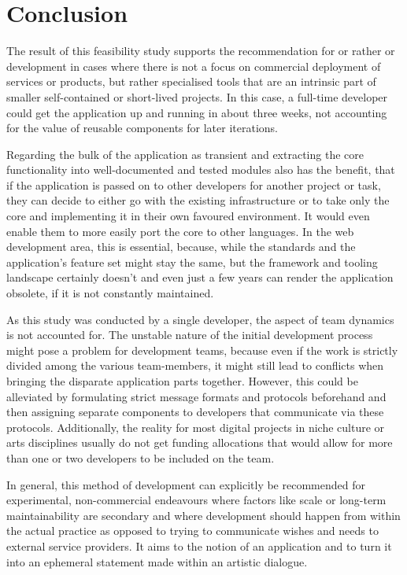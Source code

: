 \chapter{Conclusion}

The result of this feasibility study supports the recommendation for  or rather  or  development in cases where there is not a focus on commercial deployment of services or products, but rather specialised tools that are an intrinsic part of smaller self-contained or short-lived projects. In this case, a full-time developer could get the application up and running in about three weeks, not accounting for the value of reusable components for later iterations.

Regarding the bulk of the application as transient and extracting the core functionality into well-documented and tested modules also has the benefit, that if the application is passed on to other developers for another project or task, they can decide to either go with the existing infrastructure or to take only the core and implementing it in their own favoured environment. It would even enable them to more easily port the core to other languages. In the web development area, this is essential, because, while the standards and the application's feature set might stay the same, but the framework and tooling landscape certainly doesn't and even just a few years can render the application obsolete, if it is not constantly maintained.

As this study was conducted by a single developer, the aspect of team dynamics is not accounted for. The unstable nature of the initial development process might pose a problem for development teams, because even if the work is strictly divided among the various team-members, it might still lead to conflicts when bringing the disparate application parts together. However, this could be alleviated by formulating strict message formats and protocols beforehand and then assigning separate components to developers that communicate via these protocols. Additionally, the reality for most digital projects in niche culture or arts disciplines usually do not get funding allocations that would allow for more than one or two developers to be included on the team.

In general, this method of development can explicitly be recommended for experimental, non-commercial endeavours where factors like scale or long-term maintainability are secondary and where development should happen from within the actual practice as opposed to trying to communicate wishes and needs to external service providers. It aims to  the notion of an application and to turn it into an ephemeral statement made within an artistic dialogue.

